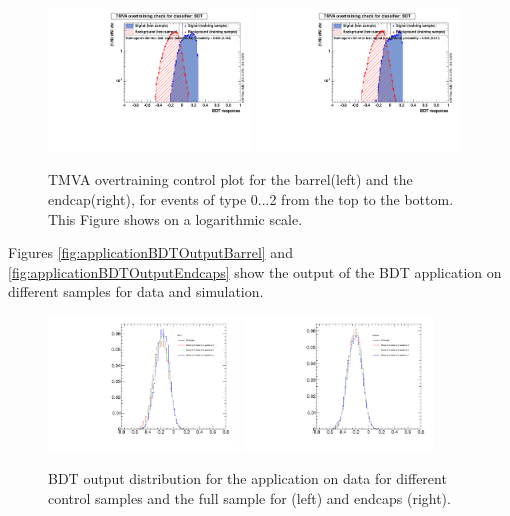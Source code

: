 \begin{figure}
                \includegraphics[width=0.48\textwidth]{Figures/bdt/overtrain_BDT_barrel_2_log}
                \includegraphics[width=0.48\textwidth]{Figures/bdt/overtrain_BDT_endcaps_2_log}
        \caption{TMVA overtraining control plot for the barrel(left) and the endcap(right), for events of type 0...2 from the top to the bottom. This Figure shows on a logarithmic scale. }
        \label{fig:overtrain_BDT_controlPlots_log}
\end{figure}

Figures \ref{fig:applicationBDTOutputBarrel} and \ref{fig:applicationBDTOutputEndcaps} show the output of the BDT application on different samples for data and \BsMuMu simulation.

\begin{figure}
  \centering
  \includegraphics[width=0.45\textwidth]{Figures/ApplicationBDTOutput_Barrel.pdf}
  \includegraphics[width=0.45\textwidth]{Figures/ApplicationBDTOutput_Endcaps.pdf}
  \caption{BDT output distribution for the application on data for different control samples and the full sample for (left) and endcaps (right).}
  \label{fig:applicationBDTOutputBackground}
\end{figure}

